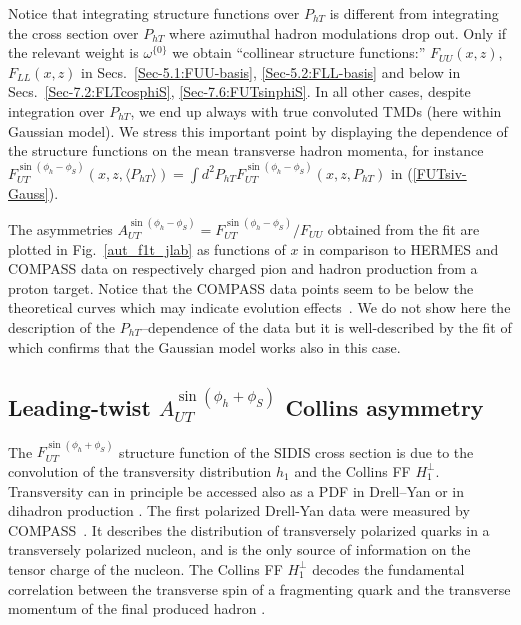 \documentclass[a4paper,11pt]{article}
\newcommand{\blue}[1]{{\color{blue} #1}}
\newcommand{\la}{\langle}
\newcommand{\ra}{\rangle}
\newcommand{\ps}[1]{\blue{#1}}
\def\Phperp{P_{hT}}
\begin{document}
Notice that integrating structure functions over $\Phperp$
is different from integrating the cross section over $\Phperp$
where azimuthal hadron modulations drop out.
Only if the relevant weight is $\omega^{\{0\}}$ we obtain
``collinear structure functions:''  $F_{UU}(x,z)$, $F_{LL}(x,z)$
in Secs.~\ref{Sec-5.1:FUU-basis}, \ref{Sec-5.2:FLL-basis}
and below in Secs.~\ref{Sec-7.2:FLTcosphiS}, \ref{Sec-7.6:FUTsinphiS}.
In all other cases, despite integration over $\Phperp$, we end up
always with true convoluted TMDs (here within Gaussian model).
We stress this important point by displaying the dependence of
the structure functions on the mean transverse hadron momenta, for instance
$F_{UT}^{\sin(\phi_h-\phi_S)}(x,z,\la\Phperp\ra) =
\int d^2\Phperp F_{UT}^{\sin(\phi_h-\phi_S)}(x,z,\Phperp)$
in (\ref{FUTsiv-Gauss}).

The asymmetries $A_{UT}^{\sin(\phi_h-\phi_S)}= F_{UT}^{\sin(\phi_h-\phi_S)}/F_{UU}$
obtained from the fit \cite{Anselmino:2011gs}
are plotted in Fig.~\ref{aut_f1t_jlab} as functions of $x$ in comparison
to HERMES \cite{Airapetian:2009ae} and COMPASS \cite{Adolph:2012sp} data
on respectively charged pion and hadron production from a proton target.
	{Notice that the COMPASS data points \ps{seem to be} below the
	theoretical curves which may indicate evolution
	effects~\cite{Aybat:2011ta,Anselmino:2012aa}}.
\ps{We do not show here the description of} the $P_{hT}$--dependence of the
data {but it is well-described by the fit of \cite{Anselmino:2011gs}}
which confirms that the Gaussian model works also in this case.


\subsection{\boldmath Leading-twist $A_{UT}^{\sin(\phi_h+\phi_S)}$ Collins asymmetry}
\label{Sec-5.4:Collins-basis}

The $F_{UT}^{\sin(\phi_h+\phi_S)}$ structure function of the SIDIS cross section is
due to the convolution of the transversity distribution $h_1$ and the Collins
FF $H_1^\perp$. Transversity can in principle be accessed also as a PDF in
Drell--Yan or in dihadron production
\cite{Bacchetta:2002ux,Bacchetta:2003vn,Bacchetta:2011ip,Bacchetta:2012ty,
Radici:2015mwa,Radici:2018iag}. The first polarized Drell-Yan data were
measured by COMPASS~\cite{Aghasyan:2017jop,Parsamyan:2018zju}.
It describes the distribution of transversely polarized quarks
in a transversely polarized nucleon, and is the only source of information
on the tensor charge of the nucleon. The Collins FF $H_1^\perp$ decodes the
fundamental correlation between the transverse spin of a fragmenting quark
and the transverse momentum of the final produced hadron \cite{Collins:1992kk}.
\end{document}
